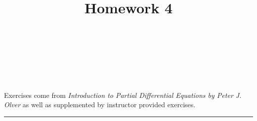 \documentclass[10pt]{amsart}
\theoremstyle{nonumberplain}
\begin{document}
\pagestyle{empty}

\newcommand{\mline}{\vspace{.2in}\hrule\vspace{.2in}}

\noindent
{} \\
 \\
 \\
 \\

\title{\bf {Homework 4} }


\maketitle
\noindent
Exercises come from \textit{Introduction to Partial Differential Equations by Peter J. Olver} as well as supplemented by instructor provided exercises.
\mline
\end{document}
